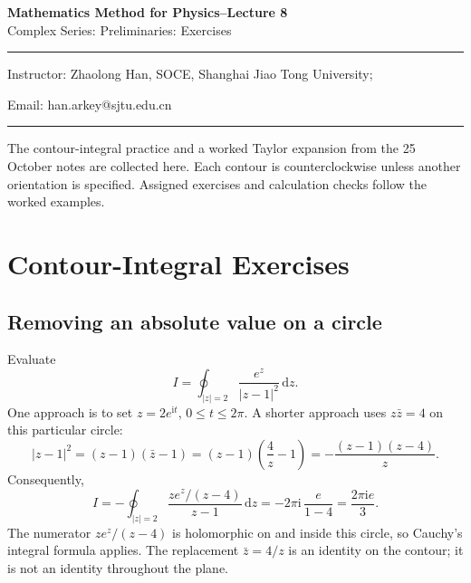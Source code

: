 \documentclass[11pt,a4paper]{article}
\theoremstyle{definition}
\theoremstyle{plain}
\newcommand{\dd}{\,\mathrm{d}}
\begin{document}
\begin{center}
    {\LARGE \textbf{Mathematics Method for Physics--Lecture 8}} \\[0.6em]
    {\large Complex Series: Preliminaries: Exercises}
\end{center}

\vspace{-0.5em}
\noindent\rule{\textwidth}{0.5pt}
\vspace{0.3em}

\begin{center}
    Instructor: Zhaolong Han, SOCE, Shanghai Jiao Tong University;
\end{center}

\vspace{-0.6em}
\noindent Email: han.arkey@sjtu.edu.cn

\vspace{0.4em}
\noindent\rule{\textwidth}{0.5pt}

\vspace{0.8em}

The contour-integral practice and a worked Taylor expansion from the
25 October notes are collected here. Each contour is counterclockwise
unless another orientation is specified. Assigned exercises and
calculation checks follow the worked examples.

\section{Contour-Integral Exercises}
\subsection{Removing an absolute value on a circle}
Evaluate
\begin{equation}\label{eq:01}
I=\oint_{|z|=2}\frac{e^z}{|z-1|^2}\dd z.
\end{equation}
One approach is to set $z=2e^{\mathrm{i}t}$, $0\leq t\leq2\pi$. A shorter approach uses
$z\bar z=4$ on this particular circle:
\begin{equation}\label{eq:02}
|z-1|^2=(z-1)(\bar z-1)
 =(z-1)\left(\frac4z-1\right)
 =-\frac{(z-1)(z-4)}z.
\end{equation}
Consequently,
\begin{equation}\label{eq:03}
I=-\oint_{|z|=2}\frac{z e^z/(z-4)}{z-1}\dd z
   =-2\pi \mathrm{i}\,\frac{e}{1-4}
   =\boxed{\frac{2\pi \mathrm{i} e}{3}}.
\end{equation}
The numerator $ze^z/(z-4)$ is holomorphic on and inside this circle, so
Cauchy's integral formula applies. The replacement $\bar z=4/z$ is an
identity on the contour; it is not an identity throughout the plane.
\end{document}
